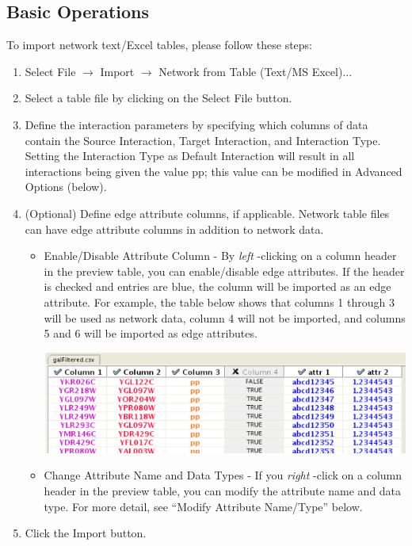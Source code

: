 \subsection{Basic Operations}

 To import network text/Excel tables, please follow these steps: 
\begin{enumerate}
\item Select File $\rightarrow$ Import $\rightarrow$ Network from Table (Text/MS Excel)... 
\item Select a table file by clicking on the Select File button. 
\item Define the interaction parameters by specifying which columns of data contain the Source Interaction, Target Interaction, and Interaction Type. Setting the Interaction Type as Default Interaction will result in all interactions being given the value pp; this value can be modified in Advanced Options (below). 
\item (Optional) Define edge attribute columns, if applicable. Network table files can have edge attribute columns in addition to network data.
\begin{itemize}
\item Enable/Disable Attribute Column - By \emph{left}
-clicking on a column header in the preview table, you can enable/disable edge attributes. If the header is checked and entries are blue, the column will be imported as an edge attribute. For example, the table below shows that columns 1 through 3 will be used as network data, column 4 will not be imported, and columns 5 and 6 will be imported as edge attributes. 
\begin{center}
\includegraphics[width=\textwidth]{images/network_table_sample.png} 
\end{center}

\item 

 Change Attribute Name and Data Types - If you \emph{right}
-click on a column header in the preview table, you can modify the attribute name and data type. For more detail, see ``Modify Attribute Name/Type'' below. 

\end{itemize}
\item Click the Import button. 
\end{enumerate}

